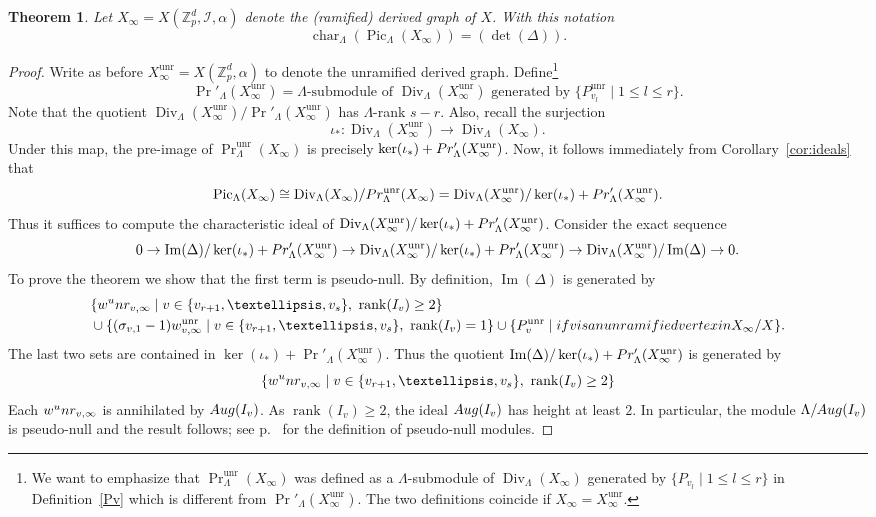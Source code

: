 \documentclass{amsart}
\newtheorem{theorem}{Theorem}[section]
\numberwithin{equation}{section}
\theoremstyle{remark}
\newcommand{\Image}{\operatorname{Im}}
\newcommand{\Div}{\operatorname{Div}}
\newcommand{\Pic}{\operatorname{Pic}}
\newcommand{\Char}{\operatorname{char}}
\newcommand{\unr}{\operatorname{unr}}
\newcommand{\rk}{\operatorname{rank}}
\newcommand{\Z}{\mathbb{Z}}
\theoremstyle{plain} %
\begin{document}
\begin{theorem}
\label{thM.char-ideals}
Let $X_\infty = X(\Z_p^d, \mathcal{I}, \alpha)$ denote the (ramified) derived graph of $X$.
With this notation
\[
\Char_\Lambda(\Pic_\Lambda(X_\infty))=(\det(\Delta)).
\]
\end{theorem}

\begin{proof}
Write {as before} $X_\infty^{\unr} = X(\Z_p^d, \alpha)$ to denote the unramified derived graph.
Define\footnote{We want to emphasize that $\Pr^{\unr}_\Lambda(X_\infty)$ was defined as a $\Lambda$-submodule of $\Div_\Lambda(X_\infty)$ generated by $\{P_{v_l} \mid 1 \le l \le r\}$ in Definition~\ref{Pv} which is different from $\Pr'_\Lambda(X_\infty^{{\unr}})$.
The two definitions coincide if $X_\infty = X_\infty^{\unr}$.} 
\[
{\Pr}'_\Lambda(X_\infty^{{\unr}}) = \Lambda\textrm{-submodule of } \Div_{\Lambda}(X_\infty^{\unr}) \textrm{ generated by } \{P_{v_l}^{\unr}\mid 1\le l\le r\}.
\]
Note that the quotient $\Div_\Lambda(X_\infty^{\unr})/\Pr'_\Lambda(X_\infty^{\unr})$ has $\Lambda$-rank $s-r$.
Also, recall the surjection
\[
\iota_* : \Div_{\Lambda}(X_\infty^{\unr}) \longrightarrow \Div_{\Lambda}(X_\infty).
\]
Under this map, the pre-image of $\Pr_{\Lambda}^{\unr}(X_\infty)$ is precisely $\ker(\iota_*)+\textup{Pr}'_\Lambda(X_\infty^{\unr})$.
Now, it follows immediately from Corollary~\ref{cor:ideals} that
\[
\Pic_\Lambda(X_\infty) \cong \Div_\Lambda(X_\infty)/\textup{Pr}^{\unr}_\Lambda(X_\infty) =\Div_\Lambda(X_\infty^{\unr})/\ker(\iota_*)+\textup{Pr}'_\Lambda(X_\infty^{\unr}).
\]
Thus it suffices to compute the characteristic ideal of $\Div_\Lambda(X_\infty^{\unr})/\ker(\iota_*)+\textup{Pr}'_\Lambda(X_\infty^{\unr})$.
Consider the exact sequence
\[
0\to \Image(\Delta)/\ker(\iota_*)+\textup{Pr}'_\Lambda(X_\infty^{\unr})\to \Div_\Lambda(X_\infty^{\unr})/\ker(\iota_*)+\textup{Pr}'_\Lambda(X_\infty^{\unr})\to \Div_\Lambda(X^{\unr}_{\infty})/\Image(\Delta)\to 0.
\]
To prove the theorem we show that the first term is pseudo-null.
{By definition, $\Image(\Delta)$ is generated by 
\begin{align*}
&\{w^\textup{unr}_{v,\infty}\mid v\in \{v_{r+1},\dots,v_s\}, \  \rk(I_v)\ge 2\}\\
&\cup \{(\sigma_{v,1}-1)w_{v,\infty}^{\unr}\mid v\in \{v_{r+1},\dots,v_s\}, \  \rk(I_v)=1\}\cup \{P_v^{\unr}\mid\textrm{ if } v \textrm{ is an unramified vertex in } X_\infty/X\}.
\end{align*}
The last two sets are contained in $\ker(\iota_*)+\Pr'_\Lambda(X_\infty^{\unr})$. Thus the quotient $\Image(\Delta)/\ker(\iota_*)+\textup{Pr}'_\Lambda(X_\infty^{\unr})$}
 is generated by 
\[
\{w^\textup{unr}_{v,\infty}\mid v\in \{v_{r+1},\dots,v_s\}, \  \rk(I_v)\ge 2\}
\]
Each $w^\textup{unr}_{v,\infty}$ is annihilated by $\textup{Aug}(I_v)$.
As $\rk(I_v)\ge 2$, the {ideal $\textup{Aug}(I_v)$ has height at least $2$.
In particular,} the module $\Lambda/\textup{Aug}(I_v)$ is pseudo-null and the result follows; {see p.~\pageref{pseudooo} for the definition of pseudo-null modules}.
\end{proof}
\end{document}
